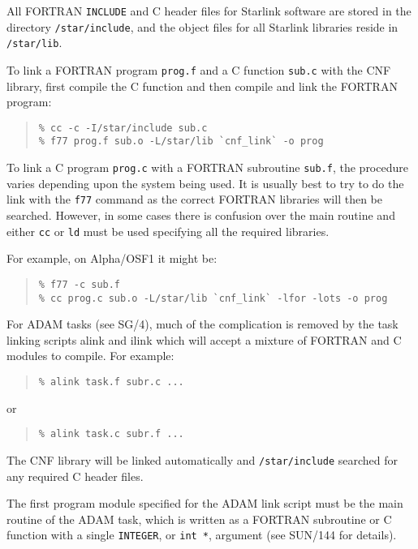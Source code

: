 \documentclass[twoside,11pt]{article}
\newcommand{\latex}[1]{#1}
\newcommand{\xref}[3]{#1}
\renewcommand{\_}{\texttt{\symbol{95}}}
\begin{document}
All FORTRAN \texttt{INCLUDE} and C header files for Starlink software are 
stored in the directory \texttt{/star/include}, and the object files for all
Starlink libraries reside in \texttt{/star/lib}. 

To link a FORTRAN program \texttt{prog.f} and a C function \texttt{sub.c} with
the CNF library, first compile the C function and then compile and link the 
FORTRAN program:

\begin{quote} \begin{verbatim}
% cc -c -I/star/include sub.c
% f77 prog.f sub.o -L/star/lib `cnf_link` -o prog
\end{verbatim} \end{quote}

To link a C program \texttt{prog.c} with a FORTRAN subroutine \texttt{sub.f},
the procedure varies depending upon the system being used.
It is usually best to try to do the link with the \texttt{f77} command as the
correct FORTRAN libraries will then be searched.
However, in some cases there is confusion over the main routine and either
\texttt{cc} or \texttt{ld} must be used specifying all the required libraries.

For example, on Alpha/OSF1 it might be:

\begin{quote} \begin{verbatim}
% f77 -c sub.f
% cc prog.c sub.o -L/star/lib `cnf_link` -lfor -lots -o prog
\end{verbatim} \end{quote}

For 
\xref{ADAM}{sg4}{}
tasks\latex{ (see SG/4)}, much of the complication is removed by the task 
linking scripts
\xref{alink and ilink}{sun144}{ADAM_link_scripts} which will accept a mixture of
FORTRAN and C modules to compile. For example:
\begin{quote}\begin{verbatim}
% alink task.f subr.c ...
\end{verbatim}\end{quote}
or
\begin{quote}\begin{verbatim}
% alink task.c subr.f ...
\end{verbatim}\end{quote}
The CNF library will be linked automatically and \texttt{/star/include} searched
for any required C header files.

The first program module specified for the ADAM link script must be the main
routine of the ADAM task, which is written as a FORTRAN subroutine or C function
with a single \texttt{INTEGER}, or \texttt{int *}, argument (see 
\xref{SUN/144}{sun144}{ADAM_link_scripts}
for details).
\end{document}

